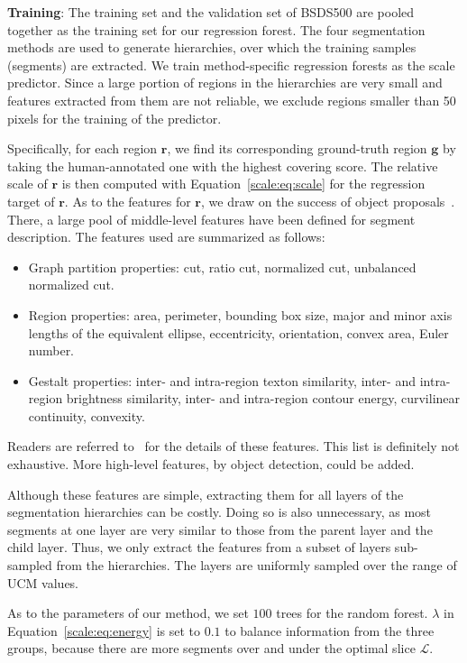 \textbf{Training}: The training set and the validation set of BSDS500
are pooled together as the training set for our regression forest. The
four segmentation methods are used to generate hierarchies,
over which the training samples (segments) are extracted.
We train method-specific regression forests
as the scale predictor.
Since a large portion of regions in the hierarchies are very small and
features extracted from them are not reliable, we exclude regions smaller
than 50 pixels for the training of the predictor.

Specifically, for each region $\mathbf{r}$, we find its corresponding
ground-truth region $\mathbf{g}$ by taking the human-annotated one with the
highest covering score. 
The relative scale of $\mathbf{r}$ is then computed with
Equation~\ref{scale:eq:scale} for the regression target of $\mathbf{r}$.
As to the features for $\mathbf{r}$, we draw on the
success of object proposals~\citep{carreira2010constrained,MCG}.
There, a large pool of middle-level features have been defined for segment description.
The features used are summarized as follows:
\begin{itemize}
\item Graph partition properties: cut, ratio cut, normalized cut, unbalanced normalized cut. 
\item Region properties:  area, perimeter, bounding box size, major and minor axis lengths of the equivalent ellipse, eccentricity, orientation, convex area, Euler number.
\item Gestalt properties: inter- and intra-region texton similarity, inter- and intra-region brightness similarity, inter- and intra-region contour energy, curvilinear continuity, convexity.
\end{itemize}
Readers are referred to~\citep{carreira2010constrained} for the details
of these features. This list is definitely not exhaustive.
More high-level features, \eg by object detection, could be added.

Although these features are simple, extracting them for all layers of
the segmentation hierarchies can be costly.
Doing so is also unnecessary, as most segments at one layer are very
similar to those from the parent layer and the child layer.
Thus, we only extract the features from a subset of layers
sub-sampled from the hierarchies.
The layers are uniformly sampled over the range of UCM values. 

As to the parameters of our method, we set $100$ trees for the random
forest. $\lambda$ in Equation~\ref{scale:eq:energy} is set to $0.1$ to
balance information from the three groups, because there are more
segments over and under the optimal slice $\mathcal{L}$. %

